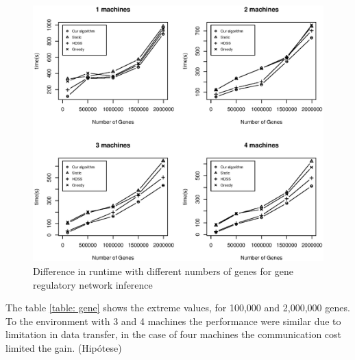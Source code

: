 \documentclass[journal]{IEEEtran}
\begin{document}
\begin{figure}[htb]
	\begin{center}
	\centering
			\includegraphics[scale=0.4]{GraficoFabrizio4maquinas.eps}
	\caption{Difference in runtime with different numbers of genes for gene regulatory network inference}
	\label{fig:Gene}
	\end{center}
\end{figure}

The table \ref{table: gene} shows the extreme values​​, for 100,000 and 2,000,000 genes. 
To the environment with 3 and 4 machines the performance were similar due to limitation in data transfer, in the case of four machines the communication cost limited the gain. (Hipótese)
\end{document}
